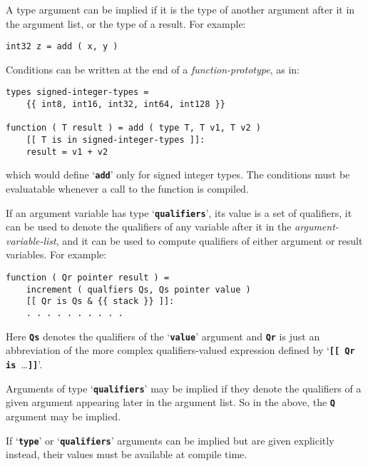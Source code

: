 \documentclass[12pt]{article}
\newcommand{\TT}[1]{{\tt \bfseries #1}}
\newenvironment{indpar}[1][0.3in]%
	{\begin{list}{}%
		     {\setlength{\itemsep}{0in}%
		      \setlength{\topsep}{0in}%
		      \setlength{\parsep}{1ex}%
		      \setlength{\labelwidth}{#1}%
		      \setlength{\leftmargin}{#1}%
		      \addtolength{\leftmargin}{\labelsep}}%
	 \item}%
	{\end{list}}
\begin{document}
A type argument can be implied if it is the type of another argument
after it in the argument list, or the type of a result.  For example:

\begin{indpar}\begin{verbatim}
int32 z = add ( x, y )
\end{verbatim}\end{indpar}

Conditions can be written at the end of a {\em function-prototype},
as in:
\begin{indpar}\begin{verbatim}
types signed-integer-types =
    {{ int8, int16, int32, int64, int128 }}

function ( T result ) = add ( type T, T v1, T v2 )
    [[ T is in signed-integer-types ]]:
    result = v1 + v2
\end{verbatim}\end{indpar}

which would define `\TT{add}' only for signed integer types.
The conditions must be evaluatable whenever a call to the
function is compiled.

If an argument variable has type `\TT{qualifiers}',
its value is a set of qualifiers,
it can be used to denote the qualifiers of any variable
after it in the {\em argument-variable-list}, and it can be
used to compute qualifiers of either argument or result variables.
For example:
\begin{indpar}\begin{verbatim}
function ( Qr pointer result ) =
    increment ( qualfiers Qs, Qs pointer value )
    [[ Qr is Qs & {{ stack }} ]]:
    . . . . . . . . . .
\end{verbatim}\end{indpar}

Here \TT{Qs} denotes the qualifiers of the `\TT{value}' argument
and \TT{Qr} is just an abbreviation of the more complex
qualifiers-valued expression defined by `\TT{[[ Qr is~}\ldots\TT{]]}'.

Arguments of type `\TT{qualifiers}' may be implied if they
denote the qualifiers of a given argument appearing later in the
argument list.  So in the above,
the \TT{Q} argument may be implied.

If `\TT{type}' or `\TT{qualifiers}' arguments can be implied
but are given explicitly instead, their values must be available
at compile time.
\end{document}
